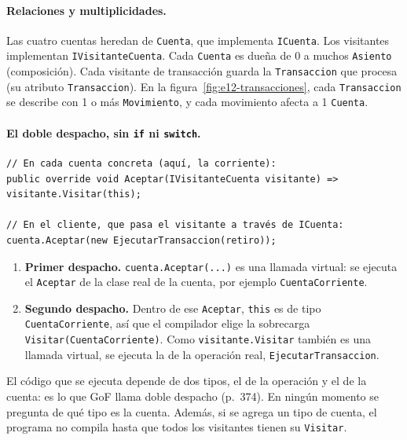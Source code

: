 \paragraph{Relaciones y multiplicidades.}
Las cuatro cuentas heredan de \texttt{Cuenta}, que implementa \texttt{ICuenta}. Los
visitantes implementan \texttt{IVisitanteCuenta}. Cada \texttt{Cuenta} es dueña de 0 a muchos
\texttt{Asiento} (composición). Cada visitante de transacción guarda la \texttt{Transaccion}
que procesa (su atributo \texttt{Transaccion}). En la figura~\ref{fig:e12-transacciones}, cada
\texttt{Transaccion} se describe con 1 o más \texttt{Movimiento}, y cada movimiento afecta a 1
\texttt{Cuenta}.

\paragraph{El doble despacho, sin \texttt{if} ni \texttt{switch}.}

\begin{lstlisting}[basicstyle=\ttfamily\footnotesize, columns=fullflexible, keepspaces=true]
// En cada cuenta concreta (aquí, la corriente):
public override void Aceptar(IVisitanteCuenta visitante) => visitante.Visitar(this);

// En el cliente, que pasa el visitante a través de ICuenta:
cuenta.Aceptar(new EjecutarTransaccion(retiro));
\end{lstlisting}

\begin{enumerate}
  \item \textbf{Primer despacho.} \texttt{cuenta.Aceptar(...)} es una llamada virtual: se
        ejecuta el \texttt{Aceptar} de la clase real de la cuenta, por ejemplo
        \texttt{CuentaCorriente}.
  \item \textbf{Segundo despacho.} Dentro de ese \texttt{Aceptar}, \texttt{this} es de tipo
        \texttt{CuentaCorriente}, así que el compilador elige la sobrecarga
        \texttt{Visitar(CuentaCorriente)}. Como \texttt{visitante.Visitar} también es una
        llamada virtual, se ejecuta la de la operación real, \texttt{EjecutarTransaccion}.
\end{enumerate}

El código que se ejecuta depende de dos tipos, el de la operación y el de la cuenta: es lo que
GoF llama doble despacho (p.~374). En ningún momento se pregunta de qué tipo es la cuenta.
Además, si se agrega un tipo de cuenta, el programa no compila hasta que todos los visitantes
tienen su \texttt{Visitar}.

